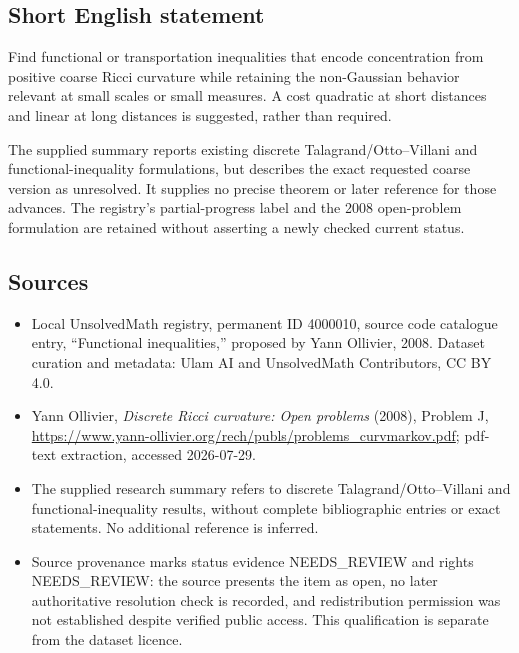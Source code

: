 \documentclass[11pt]{article}
\begin{document}
\subsection{Short English statement}
Find functional or transportation inequalities that encode concentration from positive coarse Ricci curvature while retaining the non-Gaussian behavior relevant at small scales or small measures. A cost quadratic at short distances and linear at long distances is suggested, rather than required.

The supplied summary reports existing discrete Talagrand/Otto--Villani and functional-inequality formulations, but describes the exact requested coarse version as unresolved. It supplies no precise theorem or later reference for those advances. The registry's partial-progress label and the 2008 open-problem formulation are retained without asserting a newly checked current status.
\subsection{Sources}
\begin{itemize}
\item Local UnsolvedMath registry, permanent ID 4000010, source code catalogue entry, ``Functional inequalities,'' proposed by Yann Ollivier, 2008. Dataset curation and metadata: Ulam AI and UnsolvedMath Contributors, CC BY 4.0.
\item Yann Ollivier, \emph{Discrete Ricci curvature: Open problems} (2008), Problem J, \url{https://www.yann-ollivier.org/rech/publs/problems_curvmarkov.pdf}; pdf-text extraction, accessed 2026-07-29.
\item The supplied research summary refers to discrete Talagrand/Otto--Villani and functional-inequality results, without complete bibliographic entries or exact statements. No additional reference is inferred.
\item Source provenance marks status evidence NEEDS\_REVIEW and rights NEEDS\_REVIEW: the source presents the item as open, no later authoritative resolution check is recorded, and redistribution permission was not established despite verified public access. This qualification is separate from the dataset licence.
\end{itemize}
\end{document}
